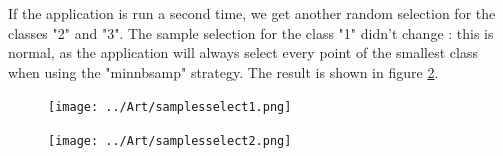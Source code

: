 If the application is run a second time, we get another random selection for the classes "2" and "3".
The sample selection for the class "1" didn't change : this is normal, 
as the application will always select every point of the smallest class when using the "minnbsamp" strategy.
The result is shown in figure \ref{fig:samples2}.



\begin{center}
  \begin{figure}[h!]
    \texttt{[image: ../Art/samplesselect1.png]}
    \label{fig:samples1}
   \end{figure}
   
   \begin{figure}[h!]
    \texttt{[image: ../Art/samplesselect2.png]}
    \label{fig:samples2}
   \end{figure}
      
\end{center}
